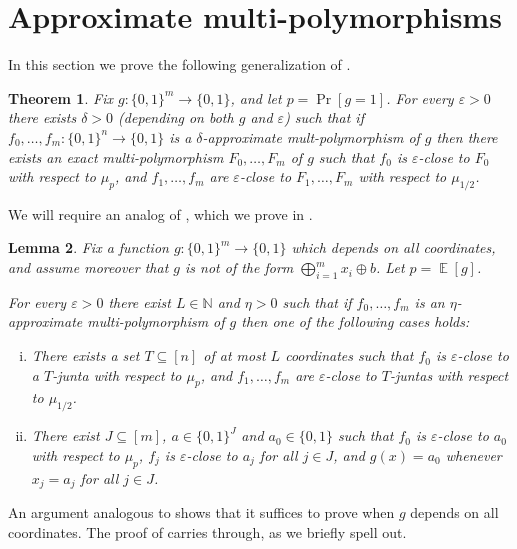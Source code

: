 \documentclass{article}
\newtheorem{theorem}{Theorem}[section]
\newtheorem{lemma}[theorem]{Lemma}
\theoremstyle{definition}
\theoremstyle{remark}
\DeclareMathOperator*{\E}{\mathbb{E}}
\newcommand\eps{\varepsilon}
\renewcommand\epsilon{\eps}
\begin{document}
\section{Approximate multi-polymorphisms}
\label{sec:approximate-polymorphisms-multi}

In this section we prove the following generalization of .

\begin{theorem} \label{thm:main-multi}
Fix $g\colon \{0,1\}^m \to \{0,1\}$, and let $p = \Pr[g=1]$. For every $\epsilon > 0$ there exists $\delta > 0$ (depending on both $g$ and $\epsilon$) such that if $f_0,\ldots,f_m\colon \{0,1\}^n \to \{0,1\}$ is a $\delta$-approximate mult-polymorphism of $g$ then there exists an exact multi-polymorphism $F_0,\ldots,F_m$ of $g$ such that $f_0$ is $\epsilon$-close to $F_0$ with respect to $\mu_p$, and $f_1,\ldots,f_m$ are $\epsilon$-close to $F_1,\ldots,F_m$ with respect to $\mu_{1/2}$.
\end{theorem}

We will require an analog of , which we prove in .

\begin{lemma} \label{lem:f-junta-multi}
Fix a function $g\colon \{0,1\}^m \to \{0,1\}$ which depends on all coordinates, and assume moreover that $g$ is not of the form $\bigoplus_{i=1}^m x_i \oplus b$. Let $p = \E[g]$.

For every $\epsilon > 0$ there exist $L \in \mathbb{N}$ and $\eta > 0$ such that if $f_0,\ldots,f_m$ is an $\eta$-approximate multi-polymorphism of $g$ then one of the following cases holds:
\begin{enumerate}[(i)]
\item There exists a set $T \subseteq [n]$ of at most $L$ coordinates such that $f_0$ is $\epsilon$-close to a $T$-junta with respect to $\mu_p$, and $f_1,\ldots,f_m$ are $\epsilon$-close to $T$-juntas with respect to $\mu_{1/2}$.
\item There exist $J \subseteq [m]$, $a \in \{0,1\}^J$ and $a_0 \in \{0,1\}$ such that $f_0$ is $\epsilon$-close to $a_0$ with respect to $\mu_p$, $f_j$ is $\epsilon$-close to $a_j$ for all $j \in J$, and $g(x) = a_0$ whenever $x_j = a_j$ for all $j \in J$.
\end{enumerate}
\end{lemma}

An argument analogous to  shows that it suffices to prove  when $g$ depends on all coordinates. The proof of  carries through, as we briefly spell out.
\end{document}
